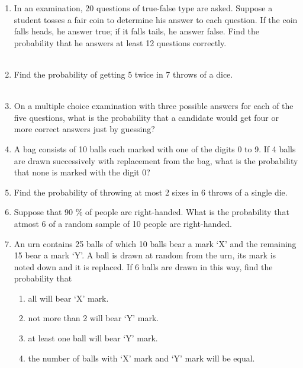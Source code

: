 \begin{enumerate}[label=\thesection.\arabic*,ref=\thesection.\theenumi]

\item In an examination, 20 questions of true-false type are asked. Suppose a student tosses a fair coin to determine his answer to each question. If the coin falls heads, he answer true; if it falls tails, he answer false. Find the probability that he answers at least 12 questions correctly.\\
\\
\solution

\item Find the probability of getting 5 twice in 7 throws of a dice.\\
\\
\solution

\item On a multiple choice examination with three possible answers for each of the five questions, what is the probability that a candidate would get four or more correct answers just by guessing$?$
\\
\solution

\item A bag consists of 10 balls each marked with one of the digits 0 to 9. If 4 balls are drawn successively with replacement from the bag, what is the probability that none is marked with the digit 0?
\\
\solution 

\item Find the probability of throwing at most 2 sixes in 6 throws of a single die.\\
\solution

\item Suppose that 90 \% of people are right-handed. What is the probability that atmost 6 of a random sample of 10 people are right-handed. 
	\\
\solution

  \item An urn contains 25 balls of which 10 balls bear a mark `X' and the 
    remaining 15 bear a mark `Y'. A ball is drawn at random from the urn, its 
    mark is noted down and it is replaced. If 6 balls are drawn in this way, 
    find the probability that 
    \begin{enumerate}
        \item all will bear `X' mark. 
        \item not more than 2 will bear `Y' mark. 
        \item at least one ball will bear `Y' mark. 
        \item the number of balls with `X' mark and `Y' mark will be equal.
    \end{enumerate}
\solution



\end{enumerate}
